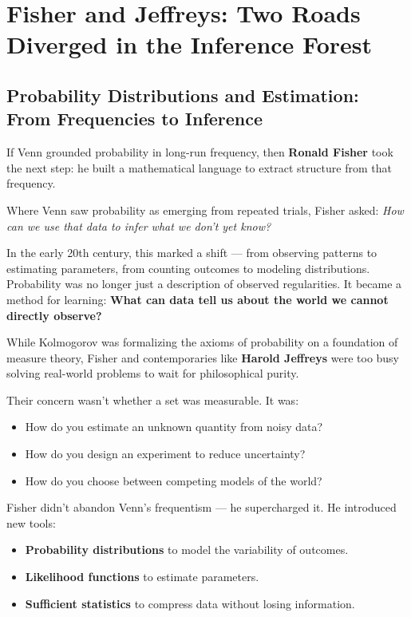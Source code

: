 \section{Fisher and Jeffreys: Two Roads Diverged in the Inference Forest}

\subsection{Probability Distributions and Estimation: From Frequencies to Inference}

If Venn grounded probability in long-run frequency, then \textbf{Ronald Fisher} took the next step: he built a mathematical language to extract structure from that frequency.

Where Venn saw probability as emerging from repeated trials, Fisher asked:  
\textit{How can we use that data to infer what we don’t yet know?}

In the early 20th century, this marked a shift — from observing patterns to estimating parameters, from counting outcomes to modeling distributions. Probability was no longer just a description of observed regularities. It became a method for learning:  
\textbf{What can data tell us about the world we cannot directly observe?}

\medskip

While Kolmogorov was formalizing the axioms of probability on a foundation of measure theory, Fisher and contemporaries like \textbf{Harold Jeffreys} were too busy solving real-world problems to wait for philosophical purity.

Their concern wasn’t whether a set was measurable. It was:

\begin{itemize}
    \item How do you estimate an unknown quantity from noisy data?
    \item How do you design an experiment to reduce uncertainty?
    \item How do you choose between competing models of the world?
\end{itemize}

Fisher didn’t abandon Venn’s frequentism — he supercharged it. He introduced new tools:

\begin{itemize}
    \item \textbf{Probability distributions} to model the variability of outcomes.
    \item \textbf{Likelihood functions} to estimate parameters.
    \item \textbf{Sufficient statistics} to compress data without losing information.
\end{itemize}

